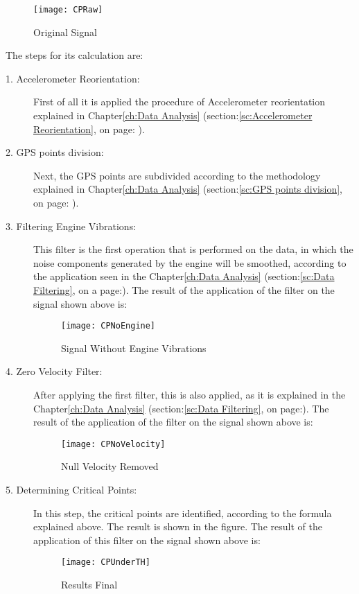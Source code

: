\documentclass[tesi]{subfiles}
\begin{document}
\begin{figure}[H]
\centering
\texttt{[image: CPRaw]}
\caption{Original Signal}
\end{figure}

The steps for its calculation are:

\begin{description}
\item[1. Accelerometer Reorientation:] First of all it is applied the procedure of Accelerometer reorientation explained in Chapter\ref{ch:Data Analysis} (section:\ref{sc:Accelerometer Reorientation}, on page: \pageref{sc:Accelerometer Reorientation}).
\item[2. GPS points division:] Next, the GPS points are subdivided according to the methodology explained in Chapter\ref{ch:Data Analysis} (section:\ref{sc:GPS points division}, on page: \pageref{sc:GPS points division}).
\item[3. Filtering Engine Vibrations:] This filter is the first operation that is performed on the data, in which the noise components generated by the engine will be smoothed, according to the application seen in the Chapter\ref{ch:Data Analysis} (section:\ref{sc:Data Filtering}, on a page:\pageref{sssc:Remove Engine Vibrations Filter}).
The result of the application of the filter on the signal shown above is:
 \begin{figure}[H]
\centering
\texttt{[image: CPNoEngine]}
\caption{Signal Without Engine Vibrations}
\end{figure}
\item[4. Zero Velocity Filter:] After applying the first filter, this is also applied, as it is explained in the Chapter\ref{ch:Data Analysis} (section:\ref{sc:Data Filtering}, on page:\pageref{sssc:Zero Velocity Filter}).
The result of the application of the filter on the signal shown above is:
 \begin{figure}[H]
\centering
\texttt{[image: CPNoVelocity]}
\caption{Null Velocity Removed}
\end{figure}
\item[5. Determining Critical Points:] In this step, the critical points are identified, according to the formula explained above. The result is shown in the figure.
The result of the application of this filter on the signal shown above	 is:
 \begin{figure}[H]
\centering
\texttt{[image: CPUnderTH]}
\caption{Results Final}
\end{figure}\label{fig:Critical Points Final Result}

\end{description}
\end{document}
